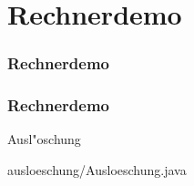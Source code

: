 \def\stitle{Rechnerdemo}
\section{\stitle}
\begin{frame}
    \frametitle{\stitle}%
\tableofcontents[current]
\end{frame}

\begin{frame}[fragile]%
  \frametitle{\stitle}%
\medskip

Ausl"oschung

{ausloeschung/Ausloeschung.java}
\end{frame}